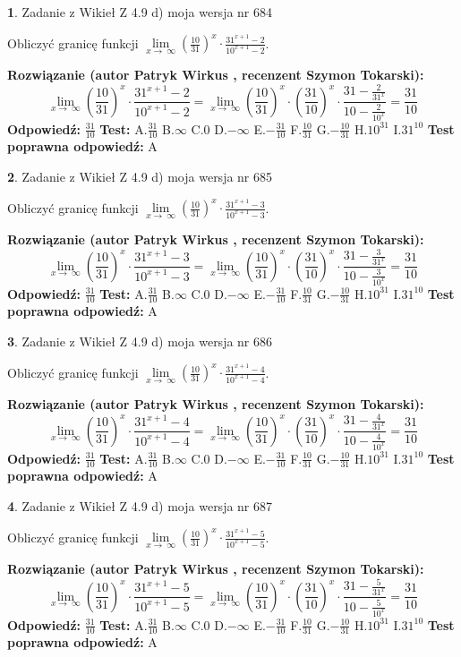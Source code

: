 \documentclass[12pt, a4paper]{article}
\theoremstyle{definition} %
\newtheorem{zad}{}
\newcommand{\zadStart}[1]{\begin{zad}#1\newline}
\newcommand{\zadStop}{\end{zad}}
\newcommand{\rozwStart}[2]{\noindent \textbf{Rozwiązanie (autor #1 , recenzent #2): }\newline}
\newcommand{\rozwStop}{\newline}
\newcommand{\odpStart}{\noindent \textbf{Odpowiedź:}\newline}
\newcommand{\odpStop}{\newline}
\newcommand{\testStart}{\noindent \textbf{Test:}\newline}
\newcommand{\testStop}{\newline}
\newcommand{\kluczStart}{\noindent \textbf{Test poprawna odpowiedź:}\newline}
\newcommand{\kluczStop}{\newline}
\begin{document}
\zadStart{Zadanie z Wikieł Z 4.9 d) moja wersja nr 684}


Obliczyć granicę funkcji  $\lim\limits_{x\to\ \infty}(\frac{10}{31})^{x}\cdot\frac{31^{x+1}-2}{10^{x+1}-2}$.
\zadStop
\rozwStart{Patryk Wirkus}{Szymon Tokarski}
$$\lim\limits_{x\to\ \infty}(\frac{10}{31})^{x}\cdot\frac{31^{x+1}-2}{10^{x+1}-2}=\lim\limits_{x\to\ \infty}(\frac{10}{31})^{x}\cdot(\frac{31}{10})^{x} \cdot \frac{31-\frac{2}{31^{x}}}{10-\frac{2}{10^{x}}} = \frac{31}{10}$$
\rozwStop
\odpStart
$\frac{31}{10}$
\odpStop
\testStart
A.$\frac{31}{10}$ B.$\infty$ C.$0$ D.$-\infty$ E.$-\frac{31}{10}$
F.$\frac{10}{31}$ G.$-\frac{10}{31}$
H.$10^{31}$
I.$31^{10}$
\testStop
\kluczStart
A
\kluczStop



\zadStart{Zadanie z Wikieł Z 4.9 d) moja wersja nr 685}


Obliczyć granicę funkcji  $\lim\limits_{x\to\ \infty}(\frac{10}{31})^{x}\cdot\frac{31^{x+1}-3}{10^{x+1}-3}$.
\zadStop
\rozwStart{Patryk Wirkus}{Szymon Tokarski}
$$\lim\limits_{x\to\ \infty}(\frac{10}{31})^{x}\cdot\frac{31^{x+1}-3}{10^{x+1}-3}=\lim\limits_{x\to\ \infty}(\frac{10}{31})^{x}\cdot(\frac{31}{10})^{x} \cdot \frac{31-\frac{3}{31^{x}}}{10-\frac{3}{10^{x}}} = \frac{31}{10}$$
\rozwStop
\odpStart
$\frac{31}{10}$
\odpStop
\testStart
A.$\frac{31}{10}$ B.$\infty$ C.$0$ D.$-\infty$ E.$-\frac{31}{10}$
F.$\frac{10}{31}$ G.$-\frac{10}{31}$
H.$10^{31}$
I.$31^{10}$
\testStop
\kluczStart
A
\kluczStop



\zadStart{Zadanie z Wikieł Z 4.9 d) moja wersja nr 686}


Obliczyć granicę funkcji  $\lim\limits_{x\to\ \infty}(\frac{10}{31})^{x}\cdot\frac{31^{x+1}-4}{10^{x+1}-4}$.
\zadStop
\rozwStart{Patryk Wirkus}{Szymon Tokarski}
$$\lim\limits_{x\to\ \infty}(\frac{10}{31})^{x}\cdot\frac{31^{x+1}-4}{10^{x+1}-4}=\lim\limits_{x\to\ \infty}(\frac{10}{31})^{x}\cdot(\frac{31}{10})^{x} \cdot \frac{31-\frac{4}{31^{x}}}{10-\frac{4}{10^{x}}} = \frac{31}{10}$$
\rozwStop
\odpStart
$\frac{31}{10}$
\odpStop
\testStart
A.$\frac{31}{10}$ B.$\infty$ C.$0$ D.$-\infty$ E.$-\frac{31}{10}$
F.$\frac{10}{31}$ G.$-\frac{10}{31}$
H.$10^{31}$
I.$31^{10}$
\testStop
\kluczStart
A
\kluczStop



\zadStart{Zadanie z Wikieł Z 4.9 d) moja wersja nr 687}


Obliczyć granicę funkcji  $\lim\limits_{x\to\ \infty}(\frac{10}{31})^{x}\cdot\frac{31^{x+1}-5}{10^{x+1}-5}$.
\zadStop
\rozwStart{Patryk Wirkus}{Szymon Tokarski}
$$\lim\limits_{x\to\ \infty}(\frac{10}{31})^{x}\cdot\frac{31^{x+1}-5}{10^{x+1}-5}=\lim\limits_{x\to\ \infty}(\frac{10}{31})^{x}\cdot(\frac{31}{10})^{x} \cdot \frac{31-\frac{5}{31^{x}}}{10-\frac{5}{10^{x}}} = \frac{31}{10}$$
\rozwStop
\odpStart
$\frac{31}{10}$
\odpStop
\testStart
A.$\frac{31}{10}$ B.$\infty$ C.$0$ D.$-\infty$ E.$-\frac{31}{10}$
F.$\frac{10}{31}$ G.$-\frac{10}{31}$
H.$10^{31}$
I.$31^{10}$
\testStop
\kluczStart
A
\kluczStop
\end{document}
